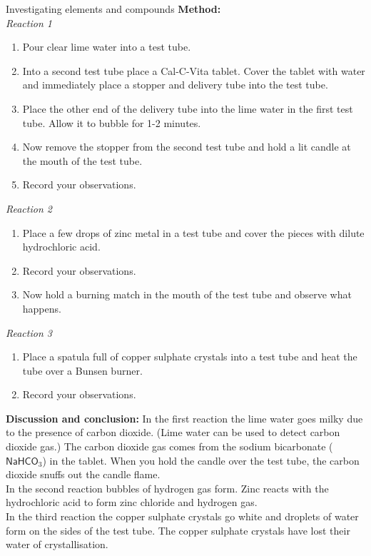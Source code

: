 \begin{g_experiment}{Investigating elements and compounds}
\textbf{Method: } \\
\textsl{Reaction 1}
\begin{enumerate}[label=\textbf{\arabic*}.]
\item Pour clear lime water into a test tube.
\item Into a second test tube place a Cal-C-Vita tablet. Cover the tablet with water and immediately place a stopper and delivery tube into the test tube.
\item Place the other end of the delivery tube into the lime water in the first test tube. Allow it to bubble for 1-2 minutes.
\item Now remove the stopper from the second test tube and hold a lit candle at the mouth of the test tube.
\item Record your observations.
\end{enumerate}
\textsl{Reaction 2}
\begin{enumerate}[label=\textbf{\arabic*}.]
\item Place a few drops of zinc metal in a test tube and cover the pieces with dilute hydrochloric acid.
\item Record your observations.
\item Now hold a burning match in the mouth of the test tube and observe what happens.
\end{enumerate}
\textsl{Reaction 3}
\begin{enumerate}[label=\textbf{\arabic*}.]
\item Place a spatula full of copper sulphate crystals into a test tube and heat the tube over a Bunsen burner.
\item Record your observations.
\end{enumerate}
\textbf{Discussion and conclusion: } In the first reaction the lime water goes milky due to the presence of carbon dioxide. (Lime water can be used to detect carbon dioxide gas.) The carbon dioxide gas comes from the sodium bicarbonate ($\textsf{NaHCO}_3$) in the tablet. When you hold the candle over the test tube, the carbon dioxide snuffs out the candle flame. \\
In the second reaction bubbles of hydrogen gas form. Zinc reacts with the hydrochloric acid to form zinc chloride and hydrogen gas. \\
In the third reaction the copper sulphate crystals go white and droplets of water form on the sides of the test tube. The copper sulphate crystals have lost their water of crystallisation. 
\end{g_experiment}
